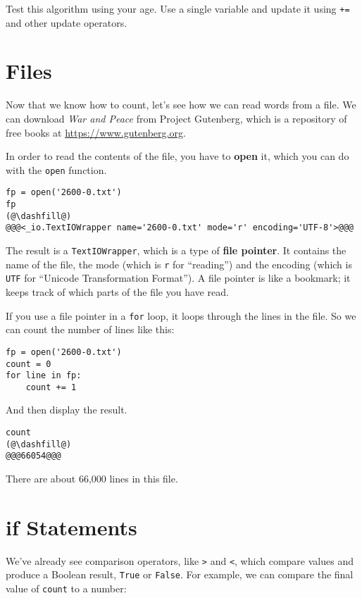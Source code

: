 Test this algorithm using your age. Use a single variable and update it
using \passthrough{\lstinline!+=!} and other update operators.

\hypertarget{files}{%
\section{Files}\label{files}}

Now that we know how to count, let's see how we can read words from a
file. We can download \emph{War and Peace} from Project Gutenberg, which
is a repository of free books at \url{https://www.gutenberg.org}.

In order to read the contents of the file, you have to \textbf{open} it,
which you can do with the \passthrough{\lstinline!open!} function.

\begin{lstlisting}[]
fp = open('2600-0.txt')
fp
(@\dashfill@)
@@@<_io.TextIOWrapper name='2600-0.txt' mode='r' encoding='UTF-8'>@@@
\end{lstlisting}

The result is a \passthrough{\lstinline!TextIOWrapper!}, which is a type
of \textbf{file pointer}. It contains the name of the file, the mode
(which is \passthrough{\lstinline!r!} for ``reading'') and the encoding
(which is \passthrough{\lstinline!UTF!} for ``Unicode Transformation
Format''). A file pointer is like a bookmark; it keeps track of which
parts of the file you have read.

If you use a file pointer in a \passthrough{\lstinline!for!} loop, it
loops through the lines in the file. So we can count the number of lines
like this:

\begin{lstlisting}[]
fp = open('2600-0.txt')
count = 0
for line in fp:
    count += 1
\end{lstlisting}

And then display the result.

\begin{lstlisting}[]
count
(@\dashfill@)
@@@66054@@@
\end{lstlisting}

There are about 66,000 lines in this file.

\hypertarget{if-statements}{%
\section{if Statements}\label{if-statements}}

We've already see comparison operators, like \passthrough{\lstinline!>!}
and \passthrough{\lstinline!<!}, which compare values and produce a
Boolean result, \passthrough{\lstinline!True!} or
\passthrough{\lstinline!False!}. For example, we can compare the final
value of \passthrough{\lstinline!count!} to a number:

